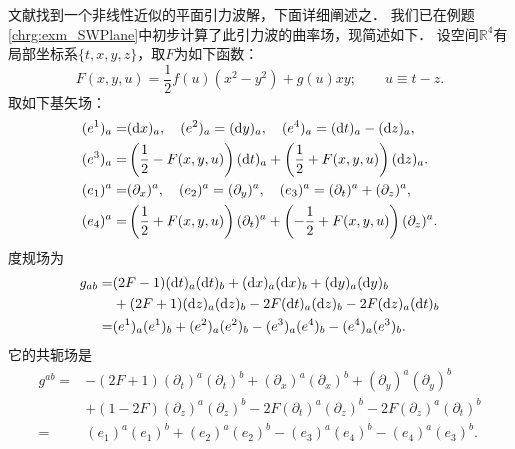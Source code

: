 文献\parencite[\S 7.6]{sachs-wu-1977}找到一个非线性近似的平面引力波解，下面详细阐述之．
我们已在例题\ref{chrg:exm_SWPlane}中初步计算了此引力波的曲率场，现简述如下．
设空间$\mathbb{R}^4$有局部坐标系$\{t, x, y, z\}$，取$F$为如下函数：
\begin{equation}\label{chle:eqn_SWP-F}
	F(x, y, u)=\frac{1}{2} f(u)\left(x^2-y^2\right)+g(u) x y;	\qquad u \equiv t-z. 
\end{equation}
取如下基矢场：
\begin{equation}\label{chle:eqn_SWP-g-frame}
	\begin{aligned}
		(e^1)_a =& ({\rm d}x)_a,\quad (e^2)_a = ({\rm d}y)_a,\quad 
		(e^4)_a = ({\rm d}t)_a -({\rm d}z)_a, \\
		(e^3)_a =& \left(\frac{1}{2}-F(x, y, u)\right)({\rm d}t)_a 
		+\left(\frac{1}{2}+F(x, y, u)\right)({\rm d}z)_a . \\
		(e_1)^{a} =& (\partial_x)^{a},\quad
		(e_2)^{a} = (\partial_y)^{a},    \quad
		(e_3)^{a} = (\partial_t)^{a}+(\partial_z)^{a}, \\
		(e_4)^{a} =& \left(\frac{1}{2}+F(x, y, u)\right) (\partial_t)^{a}
		+\left(-\frac{1}{2}+F(x, y, u)\right)(\partial_z)^{a}.
	\end{aligned}
\end{equation}
度规场为
\begin{equation}\label{chle:eqn_SWP-g}
\begin{aligned}
	g_{ab}=& (2F-1) ({\rm d}t)_a ({\rm d}t)_b+
	({\rm d}x)_a ({\rm d}x)_b + ({\rm d}y)_a ({\rm d}y)_b \\
	&+ (2F+1)({\rm d}z)_a ({\rm d}z)_b 
	- 2F ({\rm d}t)_a ({\rm d}z)_b - 2F ({\rm d}z)_a ({\rm d}t)_b \\
	=& (e^1)_a(e^1)_b + (e^2)_a(e^2)_b - (e^3)_a(e^4)_b -(e^4)_a(e^3)_b .
\end{aligned}
\end{equation}
它的共轭场是
\begin{equation}\label{chle:eqn_SWP-g-inv}
	\begin{aligned}
		g^{ab}=& -(2F+1) (\partial_t)^a (\partial_t)^b+
		(\partial_x)^a (\partial_x)^b + (\partial_y)^a (\partial_y)^b \\
		&+ (1-2F)(\partial_z)^a (\partial_z)^b 
		- 2F (\partial_t)^a (\partial_z)^b - 2F (\partial_z)^a (\partial_t)^b \\
		=& (e_1)^a(e_1)^b + (e_2)^a(e_2)^b - (e_3)^a(e_4)^b -(e_4)^a(e_3)^b .
	\end{aligned}
\end{equation}

